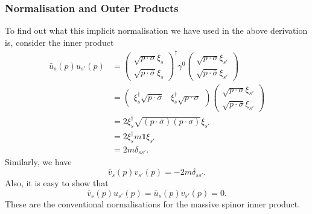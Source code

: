 \documentclass[11pt]{article}
\theoremstyle{definition}
\begin{document}
\subsubsection{Normalisation and Outer Products}
To find out what this implicit normalisation we have used in the above derivation is, consider the inner product
\begin{equation}
    \begin{aligned}
        \bar{u}_s(p)u_{s'}(p) &= 
    \begin{pmatrix}
        \sqrt{p\cdot \sigma}\xi_s \\
        \sqrt{p\cdot \bar{\sigma}}\xi_s
    \end{pmatrix}^\dagger\gamma^0
        \begin{pmatrix}
        \sqrt{p\cdot \sigma}\xi_{s'} \\
        \sqrt{p\cdot \bar{\sigma}}\xi_{s'}
    \end{pmatrix}\\
    &= 
    \begin{pmatrix}
        \xi_s^\dagger\sqrt{p\cdot \bar{\sigma}}&
        \xi_s^\dagger\sqrt{p\cdot \sigma}
    \end{pmatrix}
    \begin{pmatrix}
        \sqrt{p\cdot \sigma}\xi_{s'} \\
        \sqrt{p\cdot \bar{\sigma}}\xi_{s'}
    \end{pmatrix}\\
    &= 2\xi_{s}^\dagger\sqrt{(p\cdot \bar{\sigma})(p\cdot \sigma)}\xi_{s'}\\
    &= 2\xi_{s}^\dagger m\mathds{1}\xi_{s'} \\
    &= 2m\delta_{ss'}.
    \end{aligned}
\end{equation}
Similarly, we have
\begin{equation}
    \bar{v}_s(p)v_{s'}(p) = -2m\delta_{ss'}.
\end{equation}
Also, it is easy to show that
\begin{equation}
    \bar{v}_s(p)u_{s'}(p) = \bar{u}_s(p)v_{s'}(p) = 0.
\end{equation}
These are the conventional normalisations for the massive spinor inner product.
\end{document}
